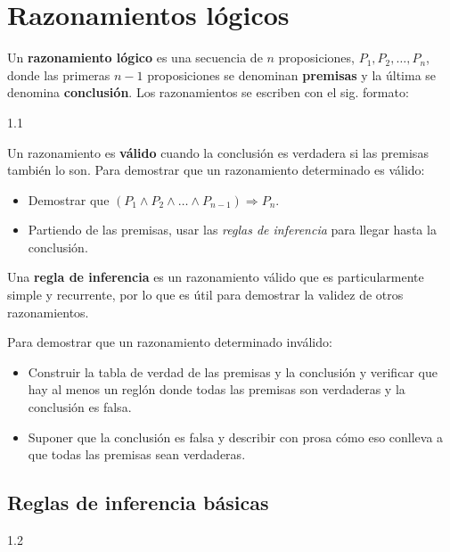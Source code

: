\chapter{Razonamientos lógicos}

Un \textbf{razonamiento lógico} es una secuencia de \(n\) proposiciones, \(P_1,P_2,\dots,P_n\), donde las primeras \(n-1\) proposiciones se denominan \textbf{premisas} y la última se denomina \textbf{conclusión}.
Los razonamientos se escriben con el sig. formato:

1.1

Un razonamiento es \textbf{válido} cuando la conclusión es verdadera si las premisas también lo son.
Para demostrar que un razonamiento determinado es válido:
\begin{itemize}
  \item Demostrar que \((P_1\land P_2\land\dots\land P_{n-1})\Rightarrow P_n\).
  \item Partiendo de las premisas, usar las \emph{reglas de inferencia} para llegar hasta la conclusión.
\end{itemize}

Una \textbf{regla de inferencia} es un razonamiento válido que es particularmente simple y recurrente, por lo que es útil para demostrar la validez de otros razonamientos.

Para demostrar que un razonamiento determinado inválido:
\begin{itemize}
  \item Construir la tabla de verdad de las premisas y la conclusión y verificar que hay al menos un reglón donde todas las premisas son verdaderas y la conclusión es falsa.
  \item Suponer que la conclusión es falsa y describir con prosa cómo eso conlleva a que todas las premisas sean verdaderas.
\end{itemize}


\newpage
\section{Reglas de inferencia básicas}


1.2
